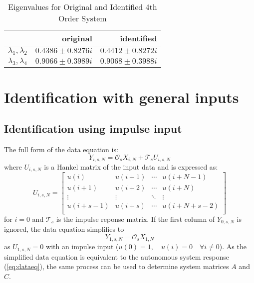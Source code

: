 \documentclass[11pt,a4paper]{article}
\begin{document}
\begin{table}
    \centering
    \begin{tabular}{|l|r|r|}
        \hline
        \nonumber & original & identified \\
        \hline
        $ \lambda_1, \lambda_2 $ &
            $ 0.4386 \pm 0.8276i $ & $ 0.4412 \pm 0.8272i $ \\
        $ \lambda_3, \lambda_4 $ &
            $ 0.9066 \pm 0.3989i $ & $ 0.9068 \pm 0.3988i $ \\
        \hline
    \end{tabular}
    \caption{Eigenvalues for Original and Identified 4th Order System}
    \label{tab:sys4eig}
\end{table}

\section{Identification with general inputs}

\subsection{Identification using impulse input}
The full form of the data equation is:
\begin{equation}
    \label{eq:fulldataeq}
    Y_{i, s, N} = \mathcal{O}_s X_{i, N} + \mathcal{T}_s U_{i, s, N}
\end{equation}
where $U_{i, s, N}$ is a Hankel matrix of the input data and is expressed as:
\begin{equation}
    \label{eq:uhankel}
    U_{i, s, N} =
        \begin{bmatrix}
            u(i) & u(i + 1) & \cdots & u(i + N - 1) \\
            u(i + 1) & u(i + 2) & \cdots & u(i + N) \\
            \vdots & \vdots & \ddots & \vdots \\
            u(i + s - 1) & u(i + s) & \cdots & u(i + N + s - 2) \\
        \end{bmatrix}
\end{equation}
for $i = 0$  and $\mathcal{T}_s$ is the impulse reponse matrix.
If the first column of $Y_{0, s, N}$ is ignored, the data equation simplifies
to
\begin{equation}
    \label{eq:simpdataeq}
    Y_{1, s, N} = \mathcal{O}_s X_{1, N}
\end{equation}
as $U_{1, s, N} = 0$ with an impulse input ($u(0) = 1, \quad u(i) = 0 \quad
\forall i \neq 0$).
As the simplified data equation is equivalent to the autonomous system response
(\autoref{eq:dataeq}), the same process can be used to determine system
matrices $A$ and $C$.
\end{document}
